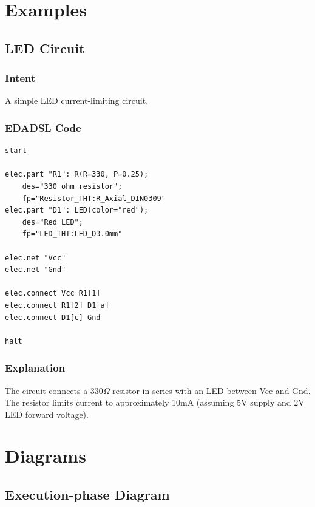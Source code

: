 \documentclass{report}
\begin{document}
\chapter{Examples}
\section{LED Circuit}
\subsection{Intent}
A simple LED current-limiting circuit.

\subsection{EDADSL Code}
\begin{verbatim}
start

elec.part "R1": R(R=330, P=0.25); 
    des="330 ohm resistor"; 
    fp="Resistor_THT:R_Axial_DIN0309"
elec.part "D1": LED(color="red"); 
    des="Red LED"; 
    fp="LED_THT:LED_D3.0mm"

elec.net "Vcc"
elec.net "Gnd"

elec.connect Vcc R1[1]
elec.connect R1[2] D1[a]
elec.connect D1[c] Gnd

halt
\end{verbatim}

\subsection{Explanation}
The circuit connects a 330$\Omega$ resistor in series with an LED between Vcc and Gnd. The resistor limits current to approximately 10mA (assuming 5V supply and 2V LED forward voltage).


\chapter{Diagrams}
\section{Execution-phase Diagram}
\end{document}
